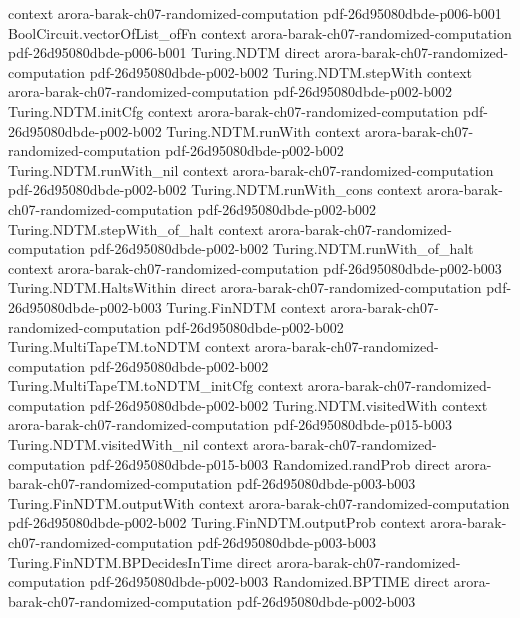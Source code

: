 \begin{theorem}
  {context}
  {arora-barak-ch07-randomized-computation}
  {pdf-26d95080dbde-p006-b001}
\proofstep
  {BoolCircuit.vectorOfList_ofFn}
  {context}
  {arora-barak-ch07-randomized-computation}
  {pdf-26d95080dbde-p006-b001}
\proofstep
  {Turing.NDTM}
  {direct}
  {arora-barak-ch07-randomized-computation}
  {pdf-26d95080dbde-p002-b002}
\proofstep
  {Turing.NDTM.stepWith}
  {context}
  {arora-barak-ch07-randomized-computation}
  {pdf-26d95080dbde-p002-b002}
\proofstep
  {Turing.NDTM.initCfg}
  {context}
  {arora-barak-ch07-randomized-computation}
  {pdf-26d95080dbde-p002-b002}
\proofstep
  {Turing.NDTM.runWith}
  {context}
  {arora-barak-ch07-randomized-computation}
  {pdf-26d95080dbde-p002-b002}
\proofstep
  {Turing.NDTM.runWith_nil}
  {context}
  {arora-barak-ch07-randomized-computation}
  {pdf-26d95080dbde-p002-b002}
\proofstep
  {Turing.NDTM.runWith_cons}
  {context}
  {arora-barak-ch07-randomized-computation}
  {pdf-26d95080dbde-p002-b002}
\proofstep
  {Turing.NDTM.stepWith_of_halt}
  {context}
  {arora-barak-ch07-randomized-computation}
  {pdf-26d95080dbde-p002-b002}
\proofstep
  {Turing.NDTM.runWith_of_halt}
  {context}
  {arora-barak-ch07-randomized-computation}
  {pdf-26d95080dbde-p002-b003}
\proofstep
  {Turing.NDTM.HaltsWithin}
  {direct}
  {arora-barak-ch07-randomized-computation}
  {pdf-26d95080dbde-p002-b003}
\proofstep
  {Turing.FinNDTM}
  {context}
  {arora-barak-ch07-randomized-computation}
  {pdf-26d95080dbde-p002-b002}
\proofstep
  {Turing.MultiTapeTM.toNDTM}
  {context}
  {arora-barak-ch07-randomized-computation}
  {pdf-26d95080dbde-p002-b002}
\proofstep
  {Turing.MultiTapeTM.toNDTM_initCfg}
  {context}
  {arora-barak-ch07-randomized-computation}
  {pdf-26d95080dbde-p002-b002}
\proofstep
  {Turing.NDTM.visitedWith}
  {context}
  {arora-barak-ch07-randomized-computation}
  {pdf-26d95080dbde-p015-b003}
\proofstep
  {Turing.NDTM.visitedWith_nil}
  {context}
  {arora-barak-ch07-randomized-computation}
  {pdf-26d95080dbde-p015-b003}
\proofstep
  {Randomized.randProb}
  {direct}
  {arora-barak-ch07-randomized-computation}
  {pdf-26d95080dbde-p003-b003}
\proofstep
  {Turing.FinNDTM.outputWith}
  {context}
  {arora-barak-ch07-randomized-computation}
  {pdf-26d95080dbde-p002-b002}
\proofstep
  {Turing.FinNDTM.outputProb}
  {context}
  {arora-barak-ch07-randomized-computation}
  {pdf-26d95080dbde-p003-b003}
\proofstep
  {Turing.FinNDTM.BPDecidesInTime}
  {direct}
  {arora-barak-ch07-randomized-computation}
  {pdf-26d95080dbde-p002-b003}
\proofstep
  {Randomized.BPTIME}
  {direct}
  {arora-barak-ch07-randomized-computation}
  {pdf-26d95080dbde-p002-b003}

\end{theorem}
